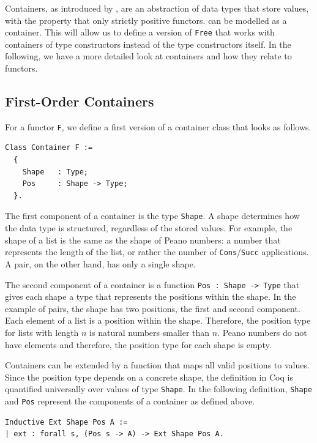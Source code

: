\documentclass[a4paper, 11pt, fleqn, twoside]{scrreprt}
\newcommand{\cinl}[1]{\texttt{#1}}
\begin{document}
Containers, as introduced by \citet{Abbott2005containers}, are an abstraction of data types that store values, with the property that only strictly positive functors. can be modelled as a container.
This will allow us to define a version of \cinl{Free} that works with containers of type constructors instead of the type constructors itself. 
In the following, we have a more detailed look at containers and how they relate to functors.

\subsection{First-Order Containers}
For a functor \cinl{F}, we define a first version of a container class that looks as follows.

\begin{verbatim}
Class Container F :=
  {
    Shape   : Type;
    Pos     : Shape -> Type;
  }.
\end{verbatim}

The first component of a container is the type \texttt{Shape}.
A shape determines how the data type is structured, regardless of the stored values.
For example, the  shape of a list is the same as the shape of Peano numbers: a number that  represents the length of the list, or rather the number of \cinl{Cons}/\cinl{Succ} applications.
A pair, on the other hand, has only a single shape.

The second component of a container is a function \cinl{Pos : Shape -> Type} that gives each shape a type that represents the positions within the shape.
In the example of pairs, the shape has two positions, the first and second component.
Each element of a list is a position within the shape.
Therefore, the position type for lists with length $n$ is natural numbers smaller than $n$.
Peano numbers do not have elements and therefore, the position type for each shape is empty.

Containers can be extended by a function that maps all valid positions to values.
Since the position type depends on a concrete shape, the definition in Coq is quantified universally over values of type \cinl{Shape}.
In the following definition, \cinl{Shape} and \cinl{Pos} represent the components of a container as defined above.

\begin{verbatim}
Inductive Ext Shape Pos A := 
| ext : forall s, (Pos s -> A) -> Ext Shape Pos A.
\end{verbatim}
\end{document}
